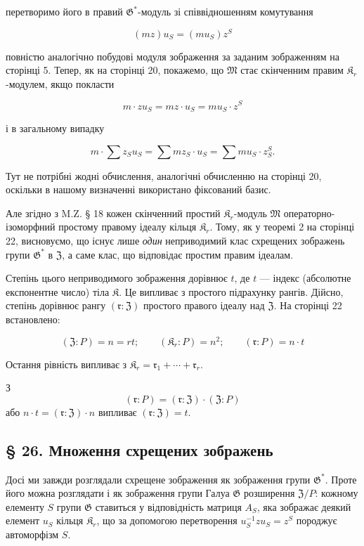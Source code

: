 \documentclass[11pt]{article}
\begin{document}
перетворимо його в правий \(\mathfrak G^*\)-модуль зі співвідношенням комутування

\[(mz) u_S = (mu_S) z^S\]

повністю аналогічно побудові модуля зображення за заданим зображенням на сторінці 5. Тепер, як на сторінці 20, покажемо, що \(\mathfrak{M}\) стає скінченним правим \(\mathfrak K_r\)-модулем, якщо покласти

\[m \cdot z u_S = mz \cdot u_S = mu_S \cdot z^S\]

і в загальному випадку

\[m \cdot \sum z_S u_S = \sum m z_S \cdot u_S = \sum m u_S \cdot z_S^S.\]

Тут не потрібні жодні обчислення, аналогічні обчисленню на сторінці 20, оскільки в нашому визначенні використано фіксований базис.

Але згідно з M.Z. § 18 кожен скінченний простий \(\mathfrak K_r\)-модуль \(\mathfrak{M}\) операторно-ізоморфний простому правому ідеалу кільця \(\mathfrak K_r\). Тому, як у теоремі 2 на сторінці 22, висновуємо, що існує лише \emph{один} неприводимий клас схрещених зображень групи \(\mathfrak{G}^*\) в \(\mathfrak Z\), а саме клас, що відповідає простим правим ідеалам.

Степінь цього неприводимого зображення дорівнює \(t\), де \(t\) --- індекс (абсолютне експонентне число) тіла \(\mathfrak K\). Це випливає з простого підрахунку рангів. Дійсно, степінь дорівнює рангу \((\mathfrak r:\mathfrak Z)\) простого правого ідеалу над \(\mathfrak Z\). На сторінці 22 встановлено:

\[
(\mathfrak Z:P)=n=rt;\qquad (\mathfrak K_r:P)=n^2;\qquad (\mathfrak r:P)=n\cdot t
\]

Остання рівність випливає з \(\mathfrak K_r = \mathfrak{r}_1 + \cdots + \mathfrak{r}_r\).

З
\[(\mathfrak{r}: P) = (\mathfrak{r}: \mathfrak Z) \cdot (\mathfrak Z: P)\]
або \(n \cdot t = (\mathfrak{r}: \mathfrak Z) \cdot n\) випливає \((\mathfrak{r}: \mathfrak Z) = t\).

\subsection*{§ 26. Множення схрещених зображень}\label{multiplikation-der-verschraenkten-darstellungen}

Досі ми завжди розглядали схрещене зображення як зображення групи \(\mathfrak{G}^*\). Проте його можна розглядати і як зображення групи Галуа \(\mathfrak{G}\) розширення \(\mathfrak Z/P\): кожному елементу \(S\) групи \(\mathfrak{G}\) ставиться у відповідність матриця \(A_S\), яка зображає деякий елемент \(u_S\) кільця \(\mathfrak K_r\), що за допомогою перетворення \(u_S^{-1}zu_S=z^S\) породжує автоморфізм \(S\).
\end{document}
